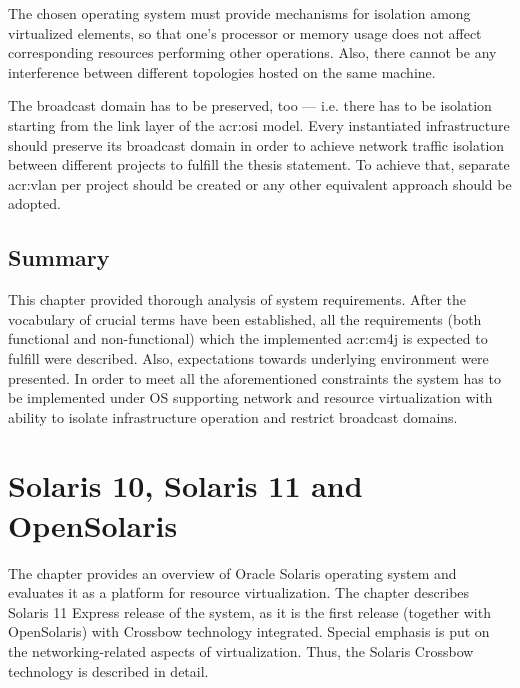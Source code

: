 \documentclass[11pt,openany]{book}
\begin{document}
      The chosen operating system must provide mechanisms for isolation among virtualized elements, so that one's
      processor or memory usage does not affect corresponding resources performing other operations. Also, there cannot
      be any interference between different topologies hosted on the same machine.

      The broadcast domain has to be preserved, too --- i.e. there has to be isolation starting from the link layer of
      the \gls{acr:osi} model. Every instantiated infrastructure should preserve its broadcast domain in order to
      achieve network traffic isolation between different projects to fulfill the thesis statement. To achieve that,
      separate \gls{acr:vlan} per project should be created or any other equivalent approach should be adopted.


    \section*{Summary}

      This chapter provided thorough analysis of system requirements. After the vocabulary of crucial terms have been
      established, all the requirements (both functional and non-functional) which the implemented \gls{acr:cm4j} is
      expected to fulfill were described. Also, expectations towards underlying environment were presented. In order to
      meet all the aforementioned constraints the system has to be implemented under OS supporting network and resource
      virtualization with ability to isolate infrastructure operation and restrict broadcast domains.


  \chapter{Solaris 10, Solaris 11 and OpenSolaris}
  \label{chap:sol}
  

    The chapter provides an overview of Oracle Solaris operating system and evaluates it as a platform for resource
    virtualization. The chapter describes Solaris 11 Express release of the system, as it is the first release (together
    with OpenSolaris) with Crossbow technology integrated. Special emphasis is put on the networking-related aspects of
    virtualization. Thus, the Solaris Crossbow technology is described in detail.
\end{document}
